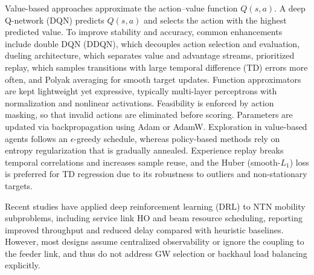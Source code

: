 
Value-based approaches approximate the action--value function \(Q(s,a)\). A deep Q-network (DQN) predicts \(Q(s,a)\) and selects the action with the highest predicted value. To improve stability and accuracy, common enhancements include double DQN (DDQN), which decouples action selection and evaluation, dueling architecture, which separates value and advantage streams, prioritized replay, which samples transitions with large temporal difference (TD) errors more often, and Polyak averaging for smooth target updates. Function approximators are kept lightweight yet expressive, typically multi-layer perceptrons with normalization and nonlinear activations. Feasibility is enforced by action masking, so that invalid actions are eliminated before scoring. Parameters are updated via backpropagation using Adam or AdamW. Exploration in value-based agents follows an \(\epsilon\)-greedy schedule, whereas policy-based methods rely on entropy regularization that is gradually annealed.
Experience replay breaks temporal correlations and increases sample reuse, and the Huber (smooth-\(L_1\)) loss is preferred for TD regression due to its robustness to outliers and non-stationary targets.

\quad Recent studies \cite{drl_handover, s23125448} have applied deep reinforcement learning (DRL) to NTN mobility subproblems, including service link HO and beam resource scheduling, reporting improved throughput and reduced delay compared with heuristic baselines. However, most designs assume centralized observability or ignore the coupling to the feeder link, and thus do not address GW selection or backhaul load balancing explicitly.

